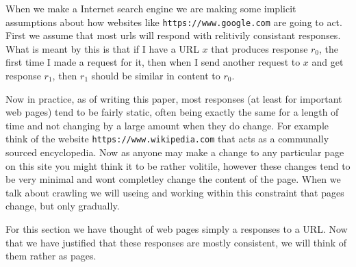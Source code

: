 \documentclass{article}
\begin{document}
	When we make a Internet search engine we are making some implicit assumptions about how websites like \verb|https://www.google.com| are going to act. First we assume that most urls will respond with relitivily consistant responses. What is meant by this is that if I have a URL $x$ that produces response $r_0$, the first time I made a request for it, then when I send another request to $x$ and get response $r_1$, then $r_1$ should be similar in content to $r_0$.
	
	Now in practice, as of writing this paper, most responses (at least for important web pages) tend to be fairly static, often being exactly the same for a length of time and not changing by a large amount when they do change. For example think of the website \verb|https://www.wikipedia.com| that acts as a communally sourced encyclopedia. Now as anyone may make a change to any particular page on this site you might think it to be rather  volitile, however these changes tend to be very minimal and wont completley change the content of the page. When we talk about crawling we will useing and working within this constraint that pages change, but only gradually.
	
	For this section we have thought of web pages simply a responses to a URL. Now that we have justified that these responses are mostly consistent, we will think of them rather as pages.
	
	
\end{document}
